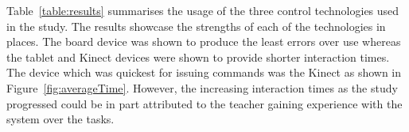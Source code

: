 \documentclass[manuscript, review, screen]{acmart}
\begin{document}

Table~\ref{table:results} summarises the usage of the three control technologies used in the study.
The results showcase the strengths of each of the technologies in places.
The board device was shown to produce the least errors over use whereas the tablet and Kinect devices were shown to provide shorter interaction times.
The device which was quickest for issuing commands was the Kinect as shown in Figure~\ref{fig:averageTime}.
However, the increasing interaction times as the study progressed could be in part attributed to the teacher gaining experience with the system over the tasks.
\end{document}
